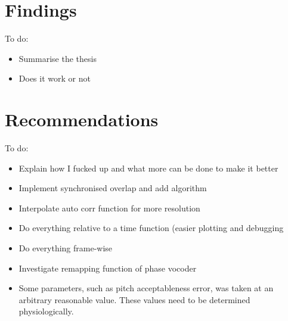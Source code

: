 
\section{Findings}

\color{red}
To do:
\begin{itemize}
	\item Summarise the thesis
	\item Does it work or not
\end{itemize}
\color{black}

\section{Recommendations}

\color{red}
To do:
\begin{itemize}
	\item Explain how I fucked up and what more can be done to make it better
	\item Implement synchronised overlap and add algorithm
	\item Interpolate auto corr function for more resolution
	\item Do everything relative to a time function (easier plotting and
		debugging
	\item Do everything frame-wise
	\item Investigate remapping function of phase vocoder
	\item Some parameters, such as pitch acceptableness error, was taken at an
	arbitrary reasonable value. These values need to be determined physiologically.
\end{itemize}
\color{black}
